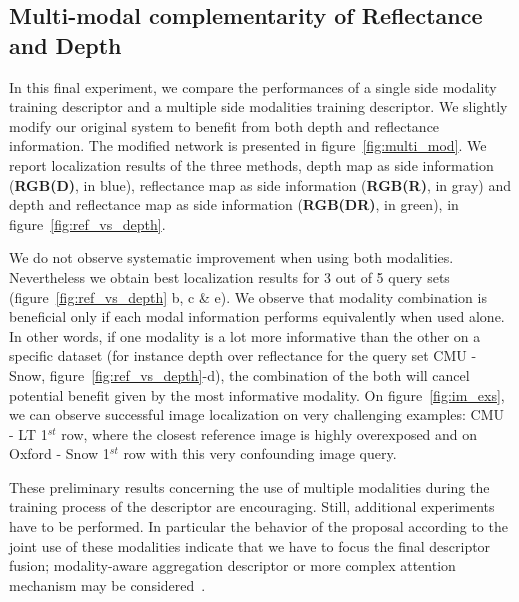 \subsection{Multi-modal complementarity of Reflectance and Depth}
In this final experiment, we compare the performances of a single side modality training descriptor and a multiple side modalities training descriptor. We slightly modify our original system to benefit from both depth and reflectance information. The modified network is presented in figure~\ref{fig:multi_mod}. We report localization results of the three methods, depth map as side information (\textbf{RGB(D)}, in blue), reflectance map as side information (\textbf{RGB(R)}, in gray) and depth and reflectance map as side information (\textbf{RGB(DR)}, in green), in figure~\ref{fig:ref_vs_depth}.

We do not observe systematic improvement when using both modalities. Nevertheless we obtain best localization results for 3 out of 5 query sets (figure~\ref{fig:ref_vs_depth} b, c \& e). We observe that modality combination is beneficial only if each modal information performs equivalently when used alone. In other words, if one modality is a lot more informative than the other on a specific dataset (for instance depth over reflectance for the query set CMU - Snow, figure~\ref{fig:ref_vs_depth}-d), the combination of the both will cancel potential benefit given by the most informative modality. On figure~\ref{fig:im_exs}, we can observe successful image localization on very challenging examples: CMU - LT 1$^{st}$ row, where the closest reference image is highly overexposed and on Oxford - Snow 1$^{st}$ row with this very confounding image query.

These preliminary results concerning the use of multiple modalities during the training process of the descriptor are encouraging. Still, additional experiments have to be performed. In particular the behavior of the proposal according to the joint use of these modalities indicate that we have to focus the final descriptor fusion; modality-aware aggregation descriptor or more complex attention mechanism may be considered~\cite{Seymour2018}.


